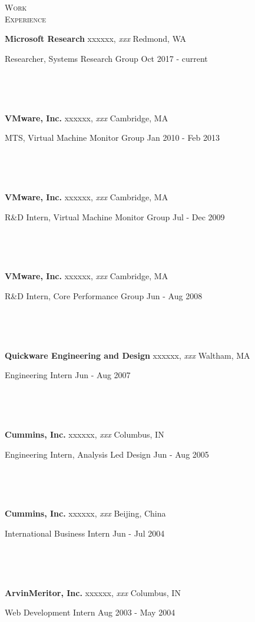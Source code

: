\documentclass[10pt,minionpro]{report}
\newlength{\sectiongap}
\newlength{\entrygap}
\newlength{\sectioncolwidth}
\newlength{\colgap}
\newlength{\stuffwidth}
\def\ifEqString#1#2{\def\testa{#1}\def\testb{#2}%
  \ifx\testa\testb}
\newenvironment{rtable}{
  \begin{minipage}{\textwidth}
  }{
  \end{minipage}
}
\newenvironment{rentry}[3][xxx]{
  \begin{minipage}[t]{\hsize}
    \textbf{#2}\ifEqString{#1}{xxx}\relax\else, \textit{#1}\fi
    \hspace{\stretch{1}} #3 \\
  }{
    \removelastskip
  \end{minipage}
  \\[\entrygap]  %
}
\newcommand{\rline}[2]{
  \begin{minipage}[t]{\hsize}
    #1 \hspace{\stretch{1}} #2
  \end{minipage} \\
}
\newenvironment{rsection}[1]{
  \begin{minipage}[t]{\sectioncolwidth}
    \textsc{#1}
  \end{minipage}
  \hspace{\colgap}
  \begin{minipage}[t]{\stuffwidth}
  }{
    \removelastskip
  \end{minipage}
  \\[\sectiongap]
}
\begin{document}
\begin{rtable}
  \begin{rsection}{Work\\Experience}
    \begin{rentry}{Microsoft Research}{Redmond, WA}
      \rline{Researcher, Systems Research Group} {Oct 2017 - current}
      \vspace{-.5em}
    \end{rentry}
    \begin{rentry}{VMware, Inc.}{Cambridge, MA}      
      \rline{MTS, Virtual Machine Monitor
        Group}{Jan 2010 - Feb 2013}
      \vspace{-.5em}
    \end{rentry}
    \begin{rentry}{VMware, Inc.}{Cambridge, MA}      
      \rline{R\&D Intern, Virtual Machine Monitor Group}{Jul - Dec 2009}
      \vspace{-.5em}
    \end{rentry}
    \begin{rentry}{VMware, Inc.}{Cambridge, MA}      
      \rline{R\&D Intern, Core Performance Group}{Jun - Aug 2008}
      \vspace{-.5em}
    \end{rentry}
    \begin{rentry}{Quickware Engineering and Design}{Waltham, MA}
      \rline{Engineering Intern}{Jun - Aug 2007} 
      \vspace{-.5em}
    \end{rentry}
    \begin{rentry}{Cummins, Inc.}{Columbus, IN}
      \rline{Engineering Intern, Analysis Led Design}{Jun - Aug 2005}
      \vspace{-.5em}
    \end{rentry}
    \begin{rentry}{Cummins, Inc.}{Beijing, China}
      \rline{International Business Intern}{Jun - Jul 2004} 
      \vspace{-.5em}
    \end{rentry}
    \begin{rentry}{ArvinMeritor, Inc.}{Columbus, IN}
      \rline{Web Development Intern}{Aug 2003 - May 2004}
      \vspace{-.5em}
    \end{rentry}
  \end{rsection}

    

\end{rtable}
\end{document}
